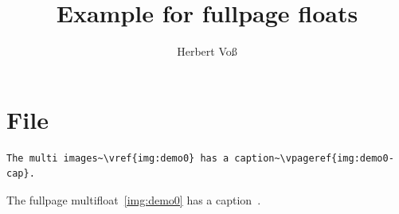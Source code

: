 \documentclass{scrartcl}
\begin{document}
\title{Example for fullpage floats}
\author{Herbert Voß}
\maketitle

\tableofcontents

\blinddocument

\section{File \texttt{\jobname}}

\begin{lstlisting}
The multi images~\vref{img:demo0} has a caption~\vpageref{img:demo0-cap}.
\end{lstlisting}

The fullpage multifloat~\vref{img:demo0} has a caption~.
\end{document}
